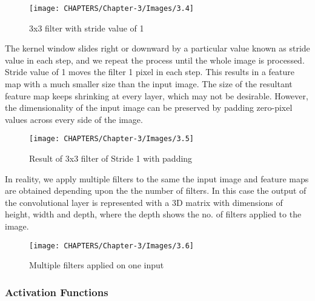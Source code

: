 \begin{figure}[H]
    \centering
        \texttt{[image: CHAPTERS/Chapter-3/Images/3.4]}
    \caption{3x3 filter with stride value of 1}
    \label{fig:3.4}
\end{figure}

The kernel window slides right or downward by a particular value known as stride value in each step, and we repeat the process
until the whole image is processed. Stride value of
1 moves the filter 1 pixel in each step. This results in a feature map with a much smaller size than the input image. The size of the resultant feature map keeps shrinking at every layer, which may not be desirable. However, the dimensionality of the input image can be preserved by padding zero-pixel values across every side of the image.

\begin{figure}[H]
    \centering
        \texttt{[image: CHAPTERS/Chapter-3/Images/3.5]}
    \caption{Result  of 3x3 filter of Stride 1 with padding}
    \label{fig:3.5}
\end{figure}

In reality, we apply multiple filters to the same 
the input image and feature maps are obtained depending upon the 
the number of filters. In this case the output of the convolutional layer 
is represented with a 3D matrix with dimensions of height, width 
and depth, where the depth 
shows the no. of filters applied to the image. 

\begin{figure}[H]
    \centering
        \texttt{[image: CHAPTERS/Chapter-3/Images/3.6]}
    \caption{Multiple filters applied on one input}
    \label{fig:3.6}
\end{figure}

\subsubsection{Activation Functions}

